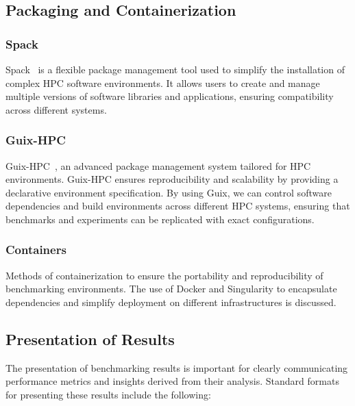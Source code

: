 \subsection{Packaging and Containerization}
\label{sec:methodology-packaging}

\subsubsection{Spack}
\label{sec:methodology-packaging-spack}

Spack~\cite{gamblin_spack_2015} is a flexible package management tool used to simplify the installation of complex HPC software environments. It allows users to create and manage multiple versions of software libraries and applications, ensuring compatibility across different systems.

\subsubsection{Guix-HPC}
\label{sec:methodology-packaging-guix-hpc}

Guix-HPC~\cite{vallet_toward_2022}, an advanced package management system tailored for HPC environments. Guix-HPC ensures reproducibility and scalability by providing a declarative environment specification. By using Guix, we can control software dependencies and build environments across different HPC systems, ensuring that benchmarks and experiments can be replicated with exact configurations.


\subsubsection{Containers}
\label{sec:methodology-packaging-container}

Methods of containerization to ensure the portability and reproducibility of benchmarking environments.
The use of Docker and Singularity to encapsulate dependencies and simplify deployment on different infrastructures is discussed.

\subsection{Presentation of Results}
\label{sec:methodology-presentation}

The presentation of benchmarking results is important for clearly communicating performance metrics and insights derived from their analysis. Standard formats for presenting these results include the following:

